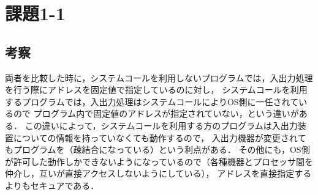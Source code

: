 \documentclass[a4j,11pt]{jarticle}
\begin{document}

\section{課題1-1}

\subsection{考察}

両者を比較した時に，システムコールを利用しないプログラムでは，入出力処理を行う際にアドレスを固定値で指定しているのに対し，
システムコールを利用するプログラムでは，入出力処理はシステムコールによりOS側に一任されているので
プログラム内で固定値のアドレスが指定されていない，という違いがある．
この違いによって，システムコールを利用する方のプログラムは入出力装置についての情報を持っていなくても動作するので，
入出力機器が変更されてもプログラムを（疎結合になっている）という利点がある．
その他にも，OS側が許可した動作しかできないようになっているので（各種機器とプロセッサ間を仲介し，互いが直接アクセスしないようにしている），
アドレスを直接指定するよりもセキュアである．




\end{document}
